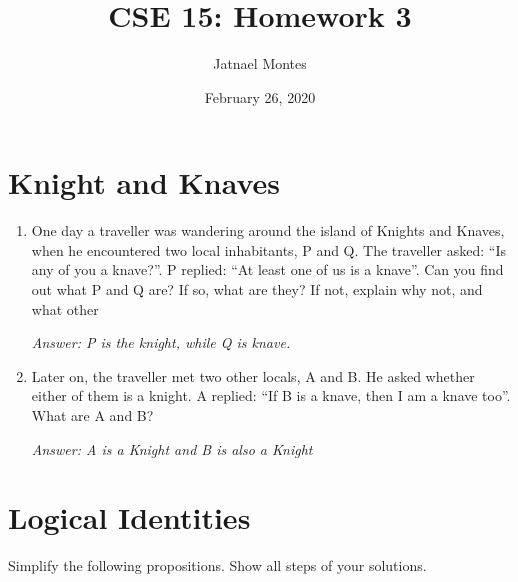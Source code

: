 \documentclass{article}
\title{CSE 15: Homework 3}
\author{Jatnael Montes}
\date{February 26, 2020}
\begin{document}
\maketitle

\section*{Knight and Knaves}
\begin{enumerate}
\item One day a traveller was wandering around the island of Knights and Knaves, when he encountered
two local inhabitants, P and Q. The traveller asked: “Is any of you a knave?”. P replied: “At least one of us is a knave”.
Can you find out what P and Q are? If so, what are they? If not, explain why not, and what other 

\emph{Answer: P is the knight, while Q is knave.}

\item Later on, the traveller met two other locals, A and B. He asked whether either of them is a knight.
A replied: “If B is a knave, then I am a knave too”.
What are A and B?

\emph{Answer: A is a Knight and B is also a Knight}
\end{enumerate}
\section*{Logical Identities}
\indent Simplify the following propositions. Show all steps of your solutions.\\
\end{document}
